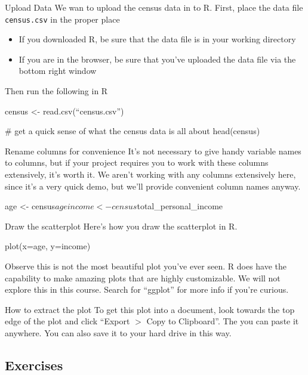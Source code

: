 \documentclass[11pt]{amsart}
\renewcommand{\(}{\left(}
\renewcommand{\)}{\right)}
\newenvironment{notes}{%
	\begin{description}[style=nextline]%
		\setlength{\itemsep}{10pt}%
		\setlength{\parskip}{2pt}%
	}
        {
	\end{description}
}
\begin{document}
\begin{notes}
\item[Upload Data]
	We wan to upload the census data in to R. First, place the data file \texttt{census.csv} in the proper place
	\begin{itemize}
		\item If you downloaded R, be sure that the data file is in your working directory
		\item If you are in the browser, be sure that you've uploaded the data file via the bottom right window 
	\end{itemize}

	Then run the following in R
	\begin{rcode}
		census <- read.csv(``census.csv'')
		
		# get a quick sense of what the census data is all about
		head(census)		
	\end{rcode}

\item[Rename columns for convenience]
	It's not necessary to give handy variable names to columns, but if your project requires you to work with these columns extensively, it's worth it. We aren't working with any columns extensively here, since it's a very quick demo, but we'll provide convenient column names anyway.
	\begin{rcode}
		age <- census$age 
		income <- census$total_personal_income
	\end{rcode}

\item[Draw the scatterplot]
	Here's how you draw the scatterplot in R.
	\begin{rcode}
		plot(x=age, y=income)
	\end{rcode}		  	
	  	
	  Observe this is not the most beautiful plot you've ever seen. R does have the capability to make amazing plots that are highly customizable.  We will not explore this in this course.  Search for ``ggplot'' for more info if you're curious.
	  
\item[How to extract the plot]
  To get this plot into a document, look towards the top edge of the plot and click ``Export $>$ Copy to Clipboard''. The you can paste it anywhere.  You can also save it to your hard drive in this way. 
\end{notes}

\subsection{Exercises}
\label{sec:}
\end{document}
